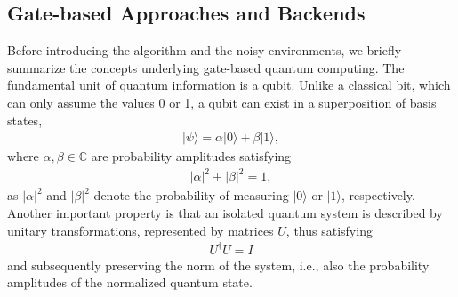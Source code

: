 \subsection{Gate-based Approaches and Backends}
\label{sec:gate-approaches-backends}
Before introducing the algorithm and the noisy environments, we briefly summarize the concepts underlying
gate-based quantum computing. The fundamental unit of quantum information is a qubit. Unlike a classical bit, which can only assume the values 0 or 1, a qubit can exist in a superposition of basis states,
\begin{align}
|\psi\rangle = \alpha |0\rangle + \beta |1\rangle,
\end{align}
where $\alpha,\beta\in\mathbb{C}$ are probability amplitudes satisfying
\begin{align}
|\alpha|^2+|\beta|^2=1,
\end{align}
as $|\alpha|^2$ and $|\beta|^2$ denote the probability of measuring $|0\rangle$ or $|1\rangle$, respectively.
Another important property is that an isolated quantum system is described by unitary transformations, represented by matrices $U$, thus satisfying
\begin{align}
U^\dagger U = I
\end{align}
and subsequently preserving the norm of the system, i.e., also the probability amplitudes of the normalized quantum state.

